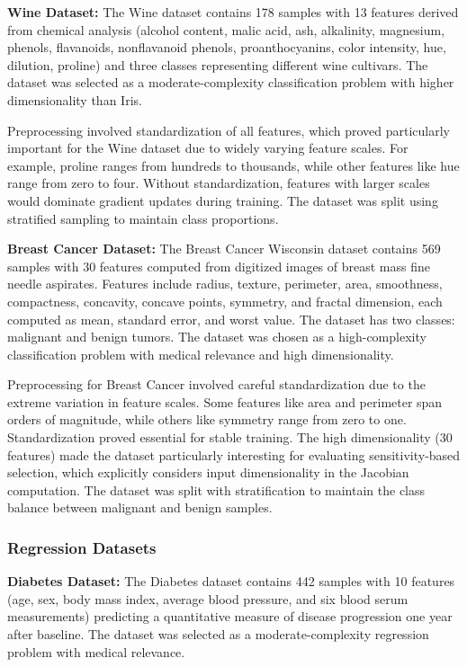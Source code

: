 \documentclass[conference]{IEEEtran}
\begin{document}
\textbf{Wine Dataset:}
The Wine dataset contains 178 samples with 13 features derived from chemical analysis (alcohol content, malic acid, ash, alkalinity, magnesium, phenols, flavanoids, nonflavanoid phenols, proanthocyanins, color intensity, hue, dilution, proline) and three classes representing different wine cultivars. The dataset was selected as a moderate-complexity classification problem with higher dimensionality than Iris.

Preprocessing involved standardization of all features, which proved particularly important for the Wine dataset due to widely varying feature scales. For example, proline ranges from hundreds to thousands, while other features like hue range from zero to four. Without standardization, features with larger scales would dominate gradient updates during training. The dataset was split using stratified sampling to maintain class proportions.

\textbf{Breast Cancer Dataset:}
The Breast Cancer Wisconsin dataset contains 569 samples with 30 features computed from digitized images of breast mass fine needle aspirates. Features include radius, texture, perimeter, area, smoothness, compactness, concavity, concave points, symmetry, and fractal dimension, each computed as mean, standard error, and worst value. The dataset has two classes: malignant and benign tumors. The dataset was chosen as a high-complexity classification problem with medical relevance and high dimensionality.

Preprocessing for Breast Cancer involved careful standardization due to the extreme variation in feature scales. Some features like area and perimeter span orders of magnitude, while others like symmetry range from zero to one. Standardization proved essential for stable training. The high dimensionality (30 features) made the dataset particularly interesting for evaluating sensitivity-based selection, which explicitly considers input dimensionality in the Jacobian computation. The dataset was split with stratification to maintain the class balance between malignant and benign samples.

\subsubsection{Regression Datasets}

\textbf{Diabetes Dataset:}
The Diabetes dataset contains 442 samples with 10 features (age, sex, body mass index, average blood pressure, and six blood serum measurements) predicting a quantitative measure of disease progression one year after baseline. The dataset was selected as a moderate-complexity regression problem with medical relevance.
\end{document}
